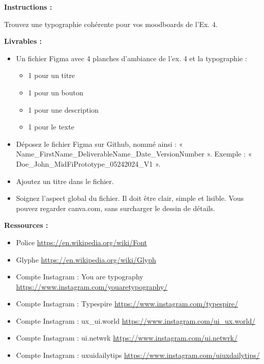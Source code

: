 \makeheaderfiles

\textbf{Instructions :}

Trouvez une typographie cohérente pour vos moodboards de l'Ex. 4.

\textbf{Livrables :}

\begin{itemize}
\item Un fichier Figma avec 4 planches d'ambiance de l'ex. 4 et la typographie :
\begin{itemize}
\item 1 pour un titre
\item 1 pour un bouton
\item 1 pour une description
\item 1 pour le texte
\end{itemize}
\item Déposez le fichier Figma sur Github, nommé ainsi : « Name\_FirstName\_DeliverableName\_Date\_VersionNumber ». Exemple : « Doe\_John\_MidFiPrototype\_05242024\_V1 ».
\item Ajoutez un titre dans le fichier.
\item Soignez l'aspect global du fichier. Il doit être clair, simple et lisible. Vous pouvez regarder canva.com, sans surcharger le dessin de détails.
\end{itemize}

\textbf{Ressources :}

\begin{itemize}
\item Police \url{https://en.wikipedia.org/wiki/Font}
\item Glyphe \url{https://en.wikipedia.org/wiki/Glyph}
\item Compte Instagram : You are typography \url{https://www.instagram.com/youaretypography/}
\item Compte Instagram : Typespire \url{https://www.instagram.com/typespire/}
\item Compte Instagram : ux\_ui.world \url{https://www.instagram.com/ui_ux.world/}
\item Compte Instagram : ui.netwrk \url{https://www.instagram.com/ui.netwrk/}
\item Compte Instagram : uxuidailytips \url{https://www.instagram.com/uiuxdailytips/}
\end{itemize}

